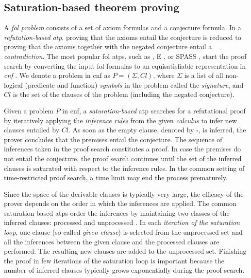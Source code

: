 
\subsection{Saturation-based theorem proving}
\label{sec:saturation}

A \emph{\acrfull{fol} problem} consists of a set of axiom formulas and a conjecture formula.
In a \emph{refutation-based} \emph{\acrfull{atp}},
proving that the axioms entail the conjecture
is reduced to proving that the axioms together with the negated conjecture entail a \emph{contradiction}.
The most popular \gls{fol} \glspl{atp}, such as \Vampire{} \cite{10.1007/978-3-642-39799-8_1}, E \cite{Schulz2019}, or SPASS \cite{DBLP:conf/cade/WeidenbachDFKSW09},
start the proof search by converting the input \gls{fol} formulas to an equisatisfiable representation in 
\emph{\acrfull{cnf}} \cite{DBLP:books/el/RV01/NonnengartW01,Harrison2009}.
We denote a problem in \gls{cnf} as $P = (\Sigma, \mathit{Cl})$,
where $\Sigma$ is a list of all non-logical (predicate and function)
\emph{symbols} in the problem called the \emph{signature},
and $\mathit{Cl}$ is the set of the clauses of the problem (including the negated conjecture).

Given a problem $P$ in \gls{cnf},
a \emph{saturation-based} \gls{atp} searches for a refutational proof
by iteratively applying the \emph{inference rules} from the given \emph{calculus}
to infer new clauses entailed by $\mathit{Cl}$.
As soon as the empty clause, denoted by $\square$, is inferred,
the prover concludes that the premises entail the conjecture.
The sequence of inferences taken in the proof search constitutes a proof.
In case the premises do not entail the conjecture,
the proof search continues until
the set of the inferred clauses is saturated with respect to the inference rules.
In the common setting of time-restricted proof search, a time limit may end the process prematurely.

Since the space of the derivable clauses is typically very large,
the efficacy of the prover depends on the order in which the inferences are applied.
The common saturation-based \glspl{atp} order the inferences
by maintaining two classes of the inferred clauses: processed and unprocessed \cite{Schulz2019}.
In each \emph{iteration of the saturation loop}, one clause (so-called \emph{given clause})
is selected from the unprocessed set
and all the inferences between the given clause and the processed clauses are performed.
The resulting new clauses are added to the unprocessed set.
Finishing the proof in few iterations of the saturation loop is important
because the number of inferred clauses typically grows exponentially during the proof search.

